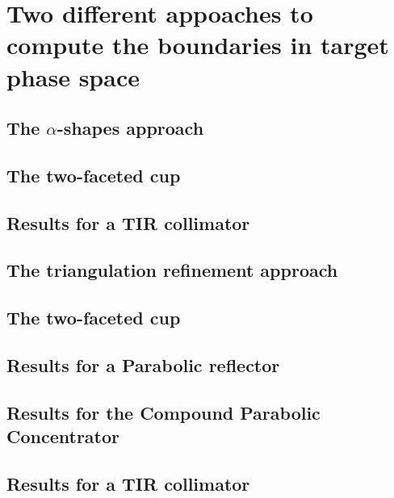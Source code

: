 \chapter{Two different appoaches to compute the boundaries in target phase space}
\section{The $\alpha$-shapes approach}
\section{The two-faceted cup}
\section{Results for a TIR collimator}
\section{The triangulation refinement approach}
\section{The two-faceted cup}
\section{Results for a Parabolic reflector}
\section{Results for the Compound Parabolic Concentrator}
\section{Results for a TIR collimator}
